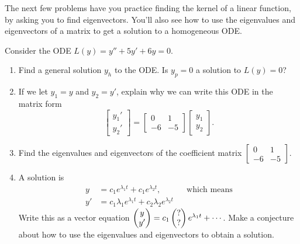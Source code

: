The next few problems have you practice finding the kernel of a linear function, by asking you to find eigenvectors. You'll also see how to use the eigenvalues and eigenvectors of a matrix to get a solution to a homogeneous ODE.
\begin{problem}
 Consider the ODE $L(y)=y''+5y'+6y=0$. 
\begin{enumerate}
 \item Find a general solution $y_h$ to the ODE.  Is $y_p=0$ a solution to $L(y)=0$?
\item If we let $y_1=y$ and $y_2=y'$, explain why we can write this ODE in the matrix form 
$$
\begin{bmatrix}
 y_1'\\y_2'
\end{bmatrix}
=\begin{bmatrix}
 0&1\\-6&-5
\end{bmatrix}
\begin{bmatrix}
 y_1\\y_2
\end{bmatrix}
.$$ 
 \item Find the eigenvalues and eigenvectors of the coefficient matrix 
$\begin{bmatrix}
 0&1\\-6&-5
\end{bmatrix}$.
 \item A solution is 
\begin{align*}
 y&=c_1 e^{\lambda_1 t}+c_1 e^{\lambda_2 t},&&\text{which means}\\ 
y'&=c_1\lambda_1 e^{\lambda_1 t}+c_2 \lambda_2e^{\lambda_2 t}
\end{align*}
Write this as a vector equation $\begin{pmatrix} y\\y' \end{pmatrix}=c_1\begin{pmatrix} ? \\ ?  \end{pmatrix}e^{\lambda_1t}+\cdots$.
Make a conjecture about how to use the eigenvalues and eigenvectors to obtain a solution.
\end{enumerate}
\end{problem}

